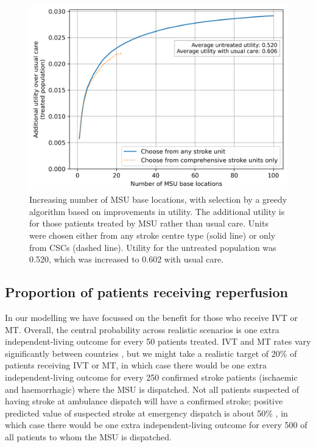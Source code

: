 \begin{figure}[h]
    \centering
    \includegraphics[width=0.5\linewidth]{images/msu_advantages_greedy.png}
    \caption{Increasing number of MSU base locations, with selection by a greedy algorithm based on improvements in utility. The additional utility is for those patients treated by MSU rather than usual care. Units were chosen either from any stroke centre type (solid line) or only from CSCs (dashed line). Utility for the untreated population was 0.520, which was increased to 0.602 with usual care.}
    \label{fig:greedy}
\end{figure}

\subsection{Proportion of patients receiving reperfusion}

In our modelling we have focussed on the benefit for those who receive IVT or MT. Overall, the central probability across realistic scenarios is one extra independent-living outcome for every 50 patients treated. IVT and MT rates vary significantly between countries \cite{kim_global_2024}, but we might take a realistic target of 20\% of patients receiving IVT or MT, in which case there would be one extra independent-living outcome for every 250 confirmed stroke patients (ischaemic and haemorrhagic) where the MSU is dispatched. Not all patients suspected of having stroke at ambulance dispatch will have a confirmed stroke; positive predicted value of suspected stroke at emergency dispatch is about 50\% \cite{kim_global_2024}, in which case there would be one extra independent-living outcome for every 500 of all patients to whom the MSU is dispatched.